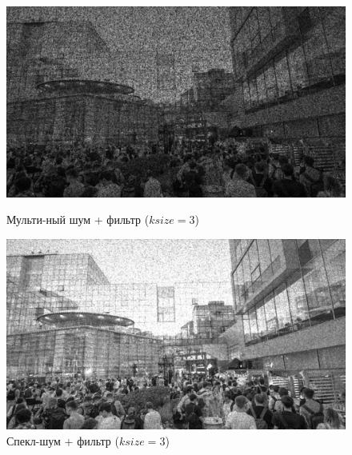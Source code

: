 \documentclass[a4paper]{article}
\begin{document}
\begin{figure}[H]
    \begin{minipage}{0.49\textwidth}
        \centering \includegraphics[width=\textwidth]{images/3_nonlinear_filters/multiplicative - 2d-median (ksize=3).jpg}
        \caption{Мульти-ный шум + фильтр ($ksize = 3$)}
    \end{minipage}\hfill
    \begin{minipage}{0.49\textwidth}
        \centering \includegraphics[width=\textwidth]{images/3_nonlinear_filters/speckle - 2d-median (ksize=3).jpg}
        \caption{Спекл-шум + фильтр ($ksize = 3$)}
    \end{minipage}
\end{figure}
\end{document}
